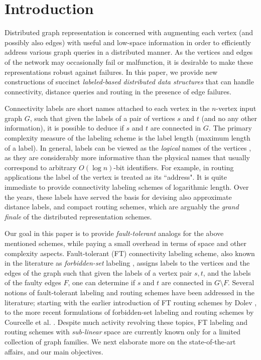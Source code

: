 \section{Introduction}
Distributed graph representation is concerned with augmenting each vertex (and possibly also edges) with useful and low-space information in order to efficiently address various graph queries in a distributed manner. As the
vertices and edges of the network may occasionally fail or malfunction, it is desirable
to make these representations robust against failures. In this paper, we provide new constructions of succinct \emph{labeled-based distributed data structures} that can handle connectivity, distance queries and routing in the presence of edge failures. 

Connectivity labels are short names attached to each vertex in the $n$-vertex input graph $G$, such that given the labels of a pair of vertices $s$ and $t$ (and no any other information), it is possible to deduce if $s$ and $t$ are connected in $G$. The primary complexity measure of the  labeling scheme is the label length (maximum length of a label). In general, labels can be viewed as the \emph{logical} names of the vertices \cite{kannan1992implicat,peleg2005informative}, as they are considerably more informative than the physical names that usually correspond to arbitrary $O(\log n)$-bit identifiers. For example, in routing applications the label of the vertex is treated as its ``address". It is quite immediate to provide connectivity labeling schemes of logarithmic length. Over the years, these labels have served the basis for devising also approximate distance labels, and compact routing schemes, which are arguably the \emph{grand finale} of the distributed representation schemes. 

Our goal in this paper is to provide \emph{fault-tolerant} analogs for the above mentioned schemes, while paying a small overhead in terms of space and other complexity aspects. Fault-tolerant (FT) connectivity labeling scheme, also known in the literature as \emph{forbidden-set} labeling \cite{CourcelleT07}, assigns labels to the vertices and the edges of the graph such that given the labels of a vertex pair $s,t$, and the labels of the faulty edges $F$, one can determine if $s$ and $t$ are connected in $G \setminus F$. Several notions of fault-tolerant labeling and routing schemes have been addressed in the literature; starting with the earlier introduction of FT routing schemes by Dolev \cite{dolev1984new}, to the more recent formulations of forbidden-set labeling and routing schemes by Courcelle et al. \cite{courcelle2007forbidden,CourcelleT07}. Despite much activity revolving these topics, FT labeling and routing schemes with \emph{sub-linear} space are currently known only for a limited collection of graph families. We next elaborate more on the state-of-the-art affairs, and our main objectives. 

